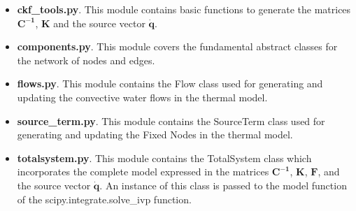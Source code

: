  \begin{itemize}
	\item \textbf{ckf\_tools.py}. This module contains basic functions to generate the matrices $\mathbf{C^{-1}}$, $\mathbf{K}$ and the source vector $\mathbf{\dot{q}}$.
\end{itemize}

% 
 
 \begin{itemize}
     \item \textbf{components.py}. This module covers the fundamental abstract classes for the network of nodes and edges.
 \end{itemize}
 
% 

 \begin{itemize}
     \item \textbf{flows.py}. This module contains the \textsf{Flow} class used for generating and updating the convective water flows in the thermal model.
 \end{itemize}
 
% 

 \begin{itemize}
     \item \textbf{source\_term.py}. This module contains the \textsf{SourceTerm} class used for generating and updating the Fixed Nodes in the thermal model.
 \end{itemize}
 
% 

 \begin{itemize}
     \item \textbf{totalsystem.py}. This module contains the \textsf{TotalSystem} class which incorporates the complete model expressed in the matrices $\mathbf{C^{-1}}$, $\mathbf{K}$, $\mathbf{F}$, and the source vector $\mathbf{\dot{q}}$. An instance of this class is passed to the model function of the \textsf{scipy.integrate.solve\_ivp} function.
 \end{itemize}
 
